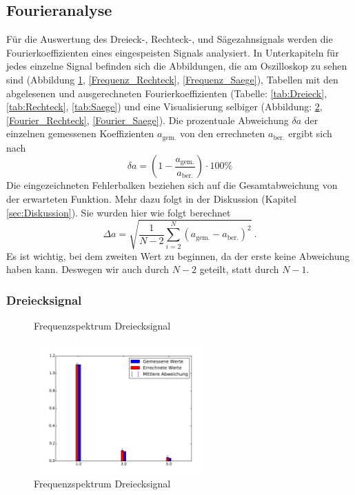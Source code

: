 \subsection{Fourieranalyse}
Für die Auswertung des Dreieck-, Rechteck-, und Sägezahnsignals werden die Fourierkoeffizienten eines eingespeisten Signals analysiert. In Unterkapiteln für jedes einzelne Signal befinden sich die Abbildungen, die am Oszilloskop zu sehen sind (Abbildung \ref{Frequenz_Dreieck}, \ref{Frequenz_Rechteck}, \ref{Frequenz_Saege}), Tabellen mit den abgelesenen und ausgerechneten Fourierkoeffizienten (Tabelle: \ref{tab:Dreieck}, \ref{tab:Rechteck}, \ref{tab:Saege})  und eine Visualisierung selbiger (Abbildung: \ref{Fourier_Dreieck}, \ref{Fourier_Rechteck}, \ref{Fourier_Saege}).
Die prozentuale Abweichung $\delta a$ der einzelnen gemessenen Koeffizienten $a_\text{gem.}$ von den errechneten $a_\text{ber.}$ ergibt sich nach
\begin{equation}
\delta a = \left(1 - \frac{a_\text{gem.}}{a_\text{ber.}}\right) \cdot 100 \%
\end{equation}
Die eingezeichneten Fehlerbalken beziehen sich auf die Gesamtabweichung von der erwarteten Funktion. Mehr dazu folgt in der Diskussion (Kapitel  \ref{sec:Diskussion}).
Sie wurden hier wie folgt berechnet
\begin{equation}
\Delta a =\sqrt{ \frac{1}{N-2} \sum_{i=2}^{N} (a_\text{gem.} - a_\text{ber.})^2 } \ .
\label{eq:Abweichung}
\end{equation}
Es ist wichtig, bei dem zweiten Wert zu beginnen, da der erste keine Abweichung haben kann. Deswegen wir auch durch $N-2$ geteilt, statt durch $N-1$.
\clearpage

\subsubsection{Dreiecksignal}

\begin{figure}[h!]
	\caption{Frequenzspektrum Dreiecksignal}
	\label{Frequenz_Dreieck}
\end{figure}

\begin{figure}[h!]
	\centering
	\includegraphics[width=0.6\textwidth]{Dreieck_Fourier.pdf}
	\caption{Frequenzspektrum Dreiecksignal}
	\label{Fourier_Dreieck}
\end{figure}

